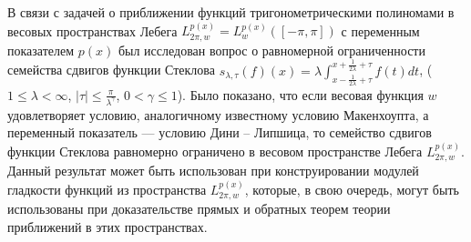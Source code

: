 В связи с задачей о приближении функций тригонометрическими полиномами в весовых пространствах Лебега $L^{p(x)}_{2\pi,w}=L^{p(x)}_w ([-\pi,\pi])$  с переменным показателем $p(x)$ был исследован вопрос о равномерной ограниченности семейства сдвигов функции Стеклова
$s_{\lambda,\tau}(f)(x) = \lambda \int_{x-\frac{1}{2\lambda}+\tau}^{x+\frac{1}{2\lambda}+\tau} f(t)dt$, ($1 \leq \lambda < \infty$, $| \tau | \leq \frac{\pi}{\lambda^{\gamma}}$, $0 < \gamma \le 1$).
Было показано, что если весовая функция $w$ удовлетворяет условию, аналогичному известному условию Макенхоупта,
а переменный показатель --- условию Дини -- Липшица, то семейство сдвигов функции
Стеклова равномерно ограничено в весовом пространстве Лебега $L^{p(x)}_{2\pi,w}$.
Данный результат может быть использован при конструировании модулей гладкости функций из пространства $L^{p(x)}_{2\pi,w}$, которые, в свою очередь, могут быть использованы при доказательстве прямых и обратных теорем теории приближений в этих пространствах.
























